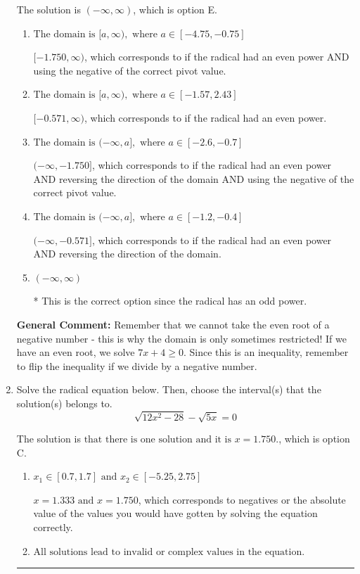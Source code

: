\documentclass{extbook}[14pt]
\newcommand{\litem}[1]{\item #1

\rule{\textwidth}{0.4pt}}
\begin{document}
\begin{enumerate}
{The solution is \( (-\infty, \infty) \), which is option E.\begin{enumerate}[label=\Alph*.]
\item \( \text{The domain is } [a, \infty), \text{   where } a \in [-4.75, -0.75] \)

$[-1.750, \infty)$, which corresponds to if the radical had an even power AND using the negative of the correct pivot value.
\item \( \text{The domain is } [a, \infty), \text{   where } a \in [-1.57, 2.43] \)

$[-0.571, \infty)$, which corresponds to if the radical had an even power.
\item \( \text{The domain is } (-\infty, a], \text{   where } a \in [-2.6, -0.7] \)

$(-\infty, -1.750]$, which corresponds to if the radical had an even power AND reversing the direction of the domain AND using the negative of the correct pivot value.
\item \( \text{The domain is } (-\infty, a], \text{   where } a \in [-1.2, -0.4] \)

$(-\infty, -0.571]$, which corresponds to if the radical had an even power AND reversing the direction of the domain.
\item \( (-\infty, \infty) \)

* This is the correct option since the radical has an odd power.
\end{enumerate}

\textbf{General Comment:} Remember that we cannot take the even root of a negative number - this is why the domain is only sometimes restricted! If we have an even root, we solve $7 x + 4 \geq 0$. Since this is an inequality, remember to flip the inequality if we divide by a negative number.
}
\litem{
Solve the radical equation below. Then, choose the interval(s) that the solution(s) belongs to.
\[ \sqrt{12 x^2 - 28} - \sqrt{5 x} = 0 \]

The solution is \( \text{that there is one solution and it is } x = 1.750. \), which is option C.\begin{enumerate}[label=\Alph*.]
\item \( x_1 \in [0.7, 1.7] \text{ and } x_2 \in [-5.25,2.75] \)

$x = 1.333 \text{ and } x = 1.750$, which corresponds to negatives or the absolute value of the values you would have gotten by solving the equation correctly.
\item \( \text{All solutions lead to invalid or complex values in the equation.} \)


\end{enumerate}}
\end{enumerate}
\end{document}
